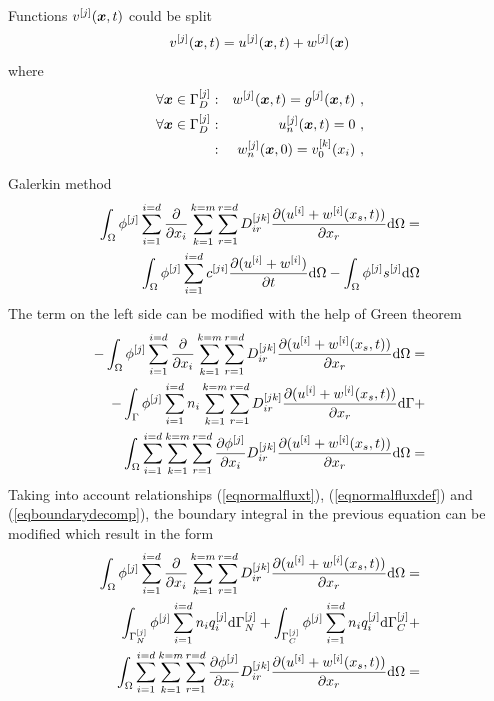 Functions $v^{[j]}(\mbox{\boldmath$x$},t)$ could be split 
\begin{eqnarray}
v^{[j]}(\mbox{\boldmath$x$},t) = u^{[j]}(\mbox{\boldmath$x$},t) + w^{[j]}(\mbox{\boldmath$x$})
\end{eqnarray}
where
\begin{eqnarray}
\forall \mbf{x} \in \Gamma^{[j]}_D &:& w^{[j]}(\mbf{x},t) = g^{[j]}(\mbf{x},t)\ ,
\\
\forall \mbf{x} \in \Gamma^{[j]}_D &:& u^{[j]}_n(\mbf{x},t) = 0\ ,
\\
                                   &:& w^{[j]}_n(\mbf{x},0) = v^{[k]}_0(x_i)\ ,
\end{eqnarray}


Galerkin method
\begin{eqnarray}\label{eqgalerkinstart}
\int_{\Omega} \phi^{[j]} \sum_{i=1}^{i=d} \mbox{$\displaystyle\frac{\partial{}}{\partial{x_i}}$} \sum_{k=1}^{k=m} \sum_{r=1}^{r=d} D^{[jk]}_{ir} 
\mbox{$\displaystyle\frac{\partial{(u^{[i]}+w^{[i]}(x_s,t))}}{\partial{x_r}}$} {\rm d}\Omega =
\\ \nonumber
\int_{\Omega} \phi^{[j]} \sum_{i=1}^{i=d} c^{[ji]} \mbox{$\displaystyle\frac{\partial{(u^{[i]}+w^{[i]})}}{\partial{t}}$} {\rm d}\Omega - 
\int_{\Omega} \phi^{[j]} s^{[j]} {\rm d}\Omega
\end{eqnarray}
The term on the left side can be modified with the help of Green theorem
\begin{eqnarray}
-\int_{\Omega} \phi^{[j]} \sum_{i=1}^{i=d} \mbox{$\displaystyle\frac{\partial{}}{\partial{x_i}}$} \sum_{k=1}^{k=m} \sum_{r=1}^{r=d} D^{[jk]}_{ir} 
\mbox{$\displaystyle\frac{\partial{(u^{[i]}+w^{[i]}(x_s,t))}}{\partial{x_r}}$} {\rm d}\Omega =
\\ \nonumber
-\int_{\Gamma} \phi^{[j]} \sum_{i=1}^{i=d} n_i \sum_{k=1}^{k=m} \sum_{r=1}^{r=d} D^{[jk]}_{ir}
\mbox{$\displaystyle\frac{\partial{(u^{[i]}+w^{[i]}(x_s,t))}}{\partial{x_r}}$} {\rm d}\Gamma +
\\ \nonumber
\int_{\Omega} \sum_{i=1}^{i=d} \sum_{k=1}^{k=m} \sum_{r=1}^{r=d} \mbox{$\displaystyle\frac{\partial{\phi^{[j]}}}{\partial{x_i}}$} D^{[jk]}_{ir} 
\mbox{$\displaystyle\frac{\partial{(u^{[i]}+w^{[i]}(x_s,t))}}{\partial{x_r}}$} {\rm d}\Omega =
\end{eqnarray}
Taking into account relationships (\ref{eqnormalfluxt}), (\ref{eqnormalfluxdef}) and (\ref{eqboundarydecomp}),
the boundary integral in the previous equation can be modified which result in the form
\begin{eqnarray}
\int_{\Omega} \phi^{[j]} \sum_{i=1}^{i=d} \mbox{$\displaystyle\frac{\partial{}}{\partial{x_i}}$} \sum_{k=1}^{k=m} \sum_{r=1}^{r=d} D^{[jk]}_{ir} 
\mbox{$\displaystyle\frac{\partial{(u^{[i]}+w^{[i]}(x_s,t))}}{\partial{x_r}}$} {\rm d}\Omega =
\\ \nonumber
\int_{\Gamma^{[j]}_N} \phi^{[j]} \sum_{i=1}^{i=d} n_i q^{[j]}_i {\rm d}\Gamma^{[j]}_N +
\int_{\Gamma^{[j]}_C} \phi^{[j]} \sum_{i=1}^{i=d} n_i q^{[j]}_i {\rm d}\Gamma^{[j]}_C +
\\ \nonumber
\int_{\Omega} \sum_{i=1}^{i=d} \sum_{k=1}^{k=m} \sum_{r=1}^{r=d} \mbox{$\displaystyle\frac{\partial{\phi^{[j]}}}{\partial{x_i}}$} D^{[jk]}_{ir} 
\mbox{$\displaystyle\frac{\partial{(u^{[i]}+w^{[i]}(x_s,t))}}{\partial{x_r}}$} {\rm d}\Omega =
\end{eqnarray}
